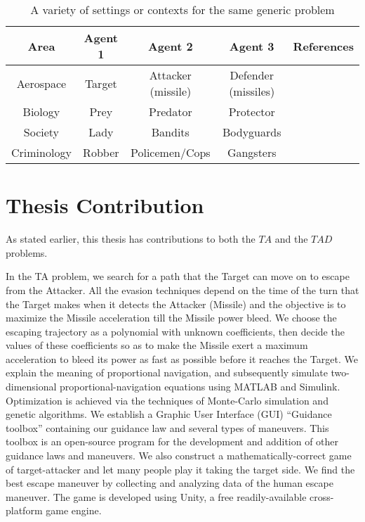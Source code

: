 \begin{table}
\begin{tabular}{ |c||c|c|c|c| } 
\hline
Area & Agent 1 & Agent 2 & Agent 3 & References \\
 \hline
 \hline
 Aerospace & Target & Attacker (missile) & Defender (missiles) & \cite{pachter2014active,garcia2015active,garcia2015escape,garcia2014cooperative,garcia2015cooperative}\\
 \hline 
 Biology & Prey & Predator & Protector & \cite{de2010analysis,oyler2014pursuit}\\
 \hline 
 Society & Lady & Bandits & Bodyguards & \cite{rusnak2005lady}\\ 
 \hline
 Criminology & Robber & Policemen/Cops & Gangsters & \cite{cheung2007pursuit}\\ 
  \hline
\end{tabular}
\caption{A variety of settings or contexts for the same generic problem}
\label{tableTAD}
\end{table}  

\section{Thesis Contribution}
As stated earlier, this thesis has contributions to both the $ TA $ and the $ TAD $ problems.

In the TA problem, we search for a path that the Target can move on to escape from the Attacker. All the evasion techniques depend on the time of the turn that the Target makes when it detects the Attacker (Missile) and the objective is to maximize the Missile acceleration till the Missile power bleed. We choose the escaping trajectory as a polynomial with unknown coefficients, then decide the values of these coefficients so as to make the Missile exert a maximum acceleration to bleed its power as fast as possible before it reaches the Target. We explain the meaning of proportional navigation, and subsequently simulate two- dimensional proportional-navigation equations using MATLAB and Simulink. Optimization is achieved via the techniques of Monte-Carlo simulation and genetic algorithms. We establish a Graphic User Interface (GUI) “Guidance toolbox” containing our guidance law and several types of maneuvers. This toolbox is an open-source program for the development and addition of other guidance laws and maneuvers. We also construct a mathematically-correct game of target-attacker and let many people play it taking the target side. We find the best escape maneuver by collecting and analyzing data of the human escape maneuver. The game is developed using Unity, a free readily-available cross-platform game engine.

